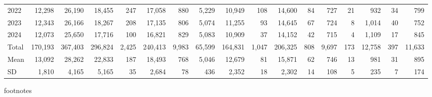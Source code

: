 \begin{sidewaystable}[h]
\begin{tabular}{lrrrrrrrrrrrrrrrr}
  2022 & 12,298 & 26,190 & 18,455 & 247 & 17,058 & 880 & 5,229 & 10,949 & 108 & 14,600 &  84 & 727 &  21 & 932 &  34 & 799 \\ 
  2023 & 12,343 & 26,166 & 18,267 & 208 & 17,135 & 806 & 5,074 & 11,255 &  93 & 14,645 &  67 & 724 &   8 & 1,014 &  40 & 752 \\ 
   \midrule
2024 & 12,073 & 25,650 & 17,716 & 100 & 16,821 & 829 & 5,083 & 10,909 &  37 & 14,152 &  42 & 715 &   4 & 1,109 &  17 & 845 \\ 
  Total & 170,193 & 367,403 & 296,824 & 2,425 & 240,413 & 9,983 & 65,599 & 164,831 & 1,047 & 206,325 & 808 & 9,697 & 173 & 12,758 & 397 & 11,633 \\ 
  Mean & 13,092 & 28,262 & 22,833 & 187 & 18,493 & 768 & 5,046 & 12,679 &  81 & 15,871 &  62 & 746 &  13 & 981 &  31 & 895 \\ 
  SD & 1,810 & 4,165 & 5,165 &  35 & 2,684 &  78 & 436 & 2,352 &  18 & 2,302 &  14 & 108 &   5 & 235 &   7 & 174 \\ 
   \bottomrule
\end{tabular}
\end{sidewaystable}
footnotes \\ 
  \midrule
{} \\ 
   \bottomrule
